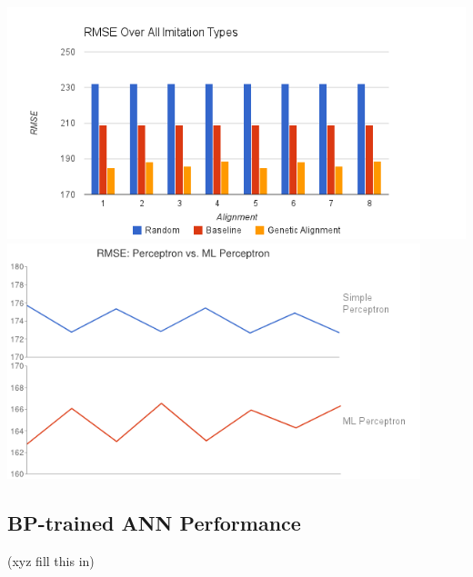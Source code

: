 \includegraphics[width=16cm]{images/chart9.png}
\includegraphics[width=12cm]{images/chart10.png}


\subsection{BP-trained ANN Performance}
(xyz fill this in)




%




